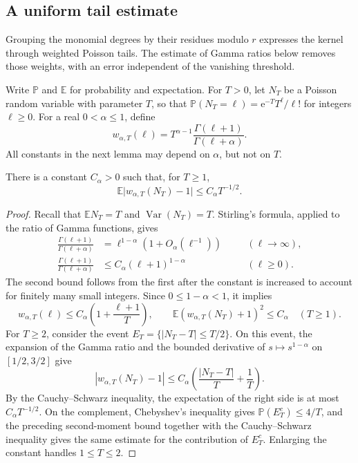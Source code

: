 \subsection{A uniform tail estimate}
\label{sec:degenerate-kernel-tail}

Grouping the monomial degrees by their residues modulo $r$ expresses the kernel through weighted Poisson tails. The estimate of Gamma ratios below removes those weights, with an error independent of the vanishing threshold.

Write $\mathbb P$ and $\mathbb E$ for probability and expectation. For $T>0$, let $N_T$ be a Poisson random variable with parameter $T$, so that
$\mathbb P(N_T=\ell)=\mathrm{e}^{-T}T^\ell/\ell!$ for integers $\ell\geq0$. For a real $0<\alpha\leq1$, define
\[
 w_{\alpha,T}(\ell)=T^{\alpha-1}\frac{\Gamma(\ell+1)}{\Gamma(\ell+\alpha)}.
\]
All constants in the next lemma may depend on $\alpha$, but not on $T$.

\begin{lemma}\label{lem:poisson-gamma-weight}
There is a constant $C_\alpha>0$ such that, for $T\geq1$,
\[
 \mathbb E\bigl|w_{\alpha,T}(N_T)-1\bigr|\leq C_\alpha T^{-1/2}.
\]
\end{lemma}
\begin{proof}
Recall that $\mathbb E N_T=T$ and $\operatorname{Var}(N_T)=T$. Stirling's formula, applied to the ratio of Gamma functions, gives
\[
 \begin{aligned}
 \frac{\Gamma(\ell+1)}{\Gamma(\ell+\alpha)}
 &=\ell^{1-\alpha}(1+O_\alpha(\ell^{-1}))&&\quad(\ell\to\infty),\\
 \frac{\Gamma(\ell+1)}{\Gamma(\ell+\alpha)}
 &\leq C_\alpha(\ell+1)^{1-\alpha}&&\quad(\ell\geq0).
 \end{aligned}
\]
The second bound follows from the first after the constant is increased to account for finitely many small integers. Since $0\leq1-\alpha<1$, it implies
\[
 w_{\alpha,T}(\ell)\leq C_\alpha\left(1+\frac{\ell+1}{T}\right),
 \qquad
 \mathbb E(w_{\alpha,T}(N_T)+1)^2\leq C_\alpha
 \quad(T\geq1).
\]
For $T\geq2$, consider the event $E_T=\{|N_T-T|\leq T/2\}$. On this event, the expansion of the Gamma ratio and the bounded derivative of $s\mapsto s^{1-\alpha}$ on $[1/2,3/2]$ give
\[
 |w_{\alpha,T}(N_T)-1|
 \leq C_\alpha\left(\frac{|N_T-T|}{T}+\frac1T\right).
\]
By the Cauchy--Schwarz inequality, the expectation of the right side is at most $C_\alpha T^{-1/2}$. On the complement, Chebyshev's inequality gives $\mathbb P(E_T^c)\leq4/T$, and the preceding second-moment bound together with the Cauchy--Schwarz inequality gives the same estimate for the contribution of $E_T^c$. Enlarging the constant handles $1\leq T\leq2$.
\end{proof}


